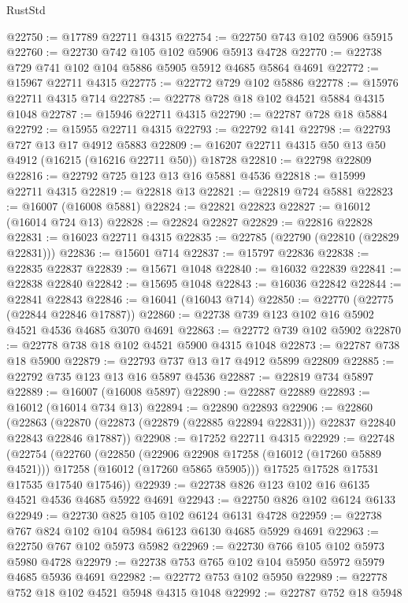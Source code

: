 \begin{lexlean}{RustStd}
\begin{coremodule}
@22750 := @17789 @22711 @4315
@22754 := @22750 @743 @102 @5906 @5915
@22760 := @22730 @742 @105 @102 @5906 @5913 @4728
@22770 := @22738 @729 @741 @102 @104 @5886 @5905 @5912 @4685 @5864 @4691
@22772 := @15967 @22711 @4315
@22775 := @22772 @729 @102 @5886
@22778 := @15976 @22711 @4315 @714
@22785 := @22778 @728 @18 @102 @4521 @5884 @4315 @1048
@22787 := @15946 @22711 @4315
@22790 := @22787 @728 @18 @5884
@22792 := @15955 @22711 @4315
@22793 := @22792 @141
@22798 := @22793 @727 @13 @17 @4912 @5883
@22809 := @16207 @22711 @4315 @50 @13 @50 @4912 (@16215 (@16216 @22711 @50)) @18728
@22810 := @22798 @22809
@22816 := @22792 @725 @123 @13 @16 @5881 @4536
@22818 := @15999 @22711 @4315
@22819 := @22818 @13
@22821 := @22819 @724 @5881
@22823 := @16007 (@16008 @5881)
@22824 := @22821 @22823
@22827 := @16012 (@16014 @724 @13)
@22828 := @22824 @22827
@22829 := @22816 @22828
@22831 := @16023 @22711 @4315
@22835 := @22785 (@22790 (@22810 (@22829 @22831)))
@22836 := @15601 @714
@22837 := @15797 @22836
@22838 := @22835 @22837
@22839 := @15671 @1048
@22840 := @16032 @22839
@22841 := @22838 @22840
@22842 := @15695 @1048
@22843 := @16036 @22842
@22844 := @22841 @22843
@22846 := @16041 (@16043 @714)
@22850 := @22770 (@22775 (@22844 @22846 @17887))
@22860 := @22738 @739 @123 @102 @16 @5902 @4521 @4536 @4685 @3070 @4691
@22863 := @22772 @739 @102 @5902
@22870 := @22778 @738 @18 @102 @4521 @5900 @4315 @1048
@22873 := @22787 @738 @18 @5900
@22879 := @22793 @737 @13 @17 @4912 @5899 @22809
@22885 := @22792 @735 @123 @13 @16 @5897 @4536
@22887 := @22819 @734 @5897
@22889 := @16007 (@16008 @5897)
@22890 := @22887 @22889
@22893 := @16012 (@16014 @734 @13)
@22894 := @22890 @22893
@22906 := @22860
    (@22863 (@22870 (@22873 (@22879 (@22885 @22894 @22831))) @22837 @22840 @22843 @22846 @17887))
@22908 := @17252 @22711 @4315
@22929 := @22748
    (@22754
      (@22760
        (@22850
          (@22906 @22908 @17258 (@16012 (@17260 @5889 @4521)))
          @17258
          (@16012 (@17260 @5865 @5905)))
        @17525
        @17528
        @17531
        @17535
        @17540
        @17546))
@22939 := @22738 @826 @123 @102 @16 @6135 @4521 @4536 @4685 @5922 @4691
@22943 := @22750 @826 @102 @6124 @6133
@22949 := @22730 @825 @105 @102 @6124 @6131 @4728
@22959 := @22738 @767 @824 @102 @104 @5984 @6123 @6130 @4685 @5929 @4691
@22963 := @22750 @767 @102 @5973 @5982
@22969 := @22730 @766 @105 @102 @5973 @5980 @4728
@22979 := @22738 @753 @765 @102 @104 @5950 @5972 @5979 @4685 @5936 @4691
@22982 := @22772 @753 @102 @5950
@22989 := @22778 @752 @18 @102 @4521 @5948 @4315 @1048
@22992 := @22787 @752 @18 @5948

\end{coremodule}
\end{lexlean}
